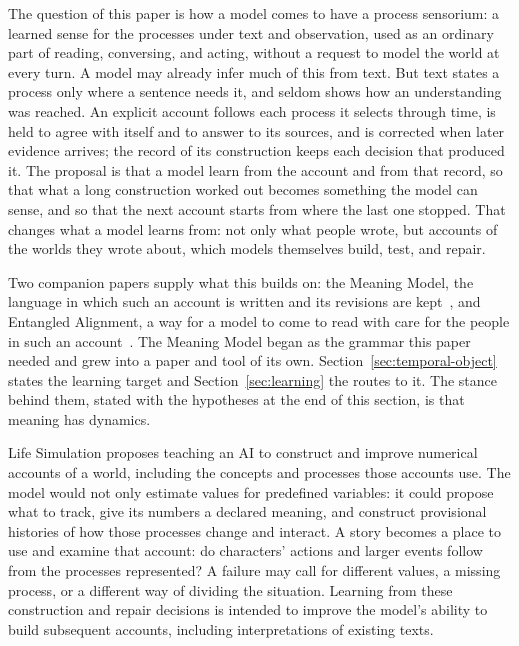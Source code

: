 \documentclass[10pt]{article}
\begin{document}
The question of this paper is how a model comes to have a process sensorium: a
learned sense for the processes under text and observation, used as an ordinary part
of reading, conversing, and acting, without a request to model the world at every
turn. A model may already infer much of this from text. But text states a process
only where a sentence needs it, and seldom shows how an understanding was reached. An
explicit account follows each process it selects through time, is held to agree with
itself and to answer to its sources, and is corrected when later evidence arrives; the
record of its construction keeps each decision that produced it. The proposal is that
a model learn from the account and from that record, so that what a long construction
worked out becomes something the model can sense, and so that the next account starts
from where the last one stopped. That changes what a model learns from: not only what
people wrote, but accounts of the worlds they wrote about, which models themselves
build, test, and repair.

Two companion papers supply what this builds on: the Meaning Model, the language
in which such an account is written and its revisions are
kept~\cite{westerbergMeaning2026}, and Entangled Alignment, a way for a model to come
to read with care for the people in such an account~\cite{westerbergEntangled2026}.
The Meaning Model began as the grammar this paper needed and grew into a paper and
tool of its own.
Section~\ref{sec:temporal-object} states the learning target and
Section~\ref{sec:learning} the routes to it. The stance behind them, stated with the
hypotheses at the end of this section, is that meaning has dynamics.

Life Simulation proposes teaching an AI to construct and improve numerical
accounts of a world, including the concepts and processes those accounts use.
The model would not only estimate values for predefined variables: it could
propose what to track, give its numbers a declared meaning, and construct
provisional histories of how those processes change and interact. A story
becomes a place to use and examine that account: do characters' actions and
larger events follow from the processes represented? A failure may call for
different values, a missing process, or a different way of dividing the
situation. Learning from these construction and repair decisions is intended
to improve the model's ability to build subsequent accounts, including
interpretations of existing texts.
\end{document}
